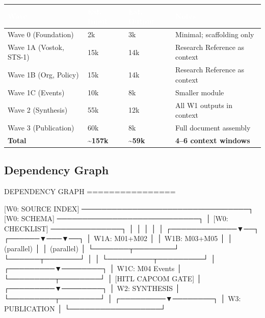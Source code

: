 \documentclass[11pt,letterpaper]{article}
\newcommand{\tableheader}[1]{\textbf{\sffamily\textcolor{white}{#1}}}
\begin{document}
\begin{center}
\begin{tabularx}{\textwidth}{L{4cm}C{2cm}C{2.5cm}X}
\toprule
{}
\tableheader{Wave} & \tableheader{Est. Input} & \tableheader{Est. Output} & \tableheader{Notes} \\
\midrule
Wave 0 (Foundation) & 2k & 3k & Minimal; scaffolding only \\
Wave 1A (Vostok, STS-1) & 15k & 14k & Research Reference as context \\
Wave 1B (Org, Policy) & 15k & 14k & Research Reference as context \\
Wave 1C (Events) & 10k & 8k & Smaller module \\
Wave 2 (Synthesis) & 55k & 12k & All W1 outputs in context \\
Wave 3 (Publication) & 60k & 8k & Full document assembly \\
\midrule
\textbf{Total} & \textbf{\textasciitilde157k} & \textbf{\textasciitilde59k} & \textbf{4--6 context windows} \\
\bottomrule
\end{tabularx}
\end{center}

\subsection{Dependency Graph}

\begin{asciibox}
DEPENDENCY GRAPH
================

[W0: SOURCE INDEX] ─────────────────────────────────┐
[W0: SCHEMA]        ────────────────────────────┐   │
[W0: CHECKLIST]     ──────────────┐             │   │
                                  │             │   │
                    ┌─────────────▼──┐   ┌──────▼───▼──┐
                    │ W1A: M01+M02   │   │ W1B: M03+M05 │
                    │ (parallel)     │   │ (parallel)   │
                    └───────┬────────┘   └──────┬───────┘
                            │                   │
                            └─────────┬─────────┘
                                      │
                            ┌─────────▼────────┐
                            │ W1C: M04 Events  │
                            └─────────┬────────┘
                                      │
                          [HITL CAPCOM GATE]
                                      │
                            ┌─────────▼────────┐
                            │  W2: SYNTHESIS   │
                            └─────────┬────────┘
                                      │
                            ┌─────────▼────────┐
                            │  W3: PUBLICATION │
                            └──────────────────┘
\end{asciibox}
\end{document}

